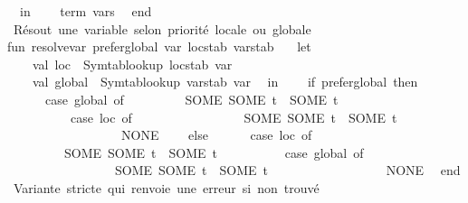 \begin{isabellebody}
\ \ in\isanewline
\ \ \ \ {\isacharparenleft}{\kern0pt}term{\isacharcomma}{\kern0pt}\ vars{\isacharparenright}{\kern0pt}\isanewline
\ \ end\isanewline
\isanewline
{\isacharparenleft}{\kern0pt}{\isacharasterisk}{\kern0pt}\ Résout\ une\ variable\ selon\ priorité\ locale\ ou\ globale\ {\isacharasterisk}{\kern0pt}{\isacharparenright}{\kern0pt}\isanewline
fun\ resolve{\isacharunderscore}{\kern0pt}var\ prefer{\isacharunderscore}{\kern0pt}global\ var\ locstab\ varstab\ {\isacharequal}{\kern0pt}\isanewline
\ \ let\isanewline
\ \ \ \ val\ loc\ {\isacharequal}{\kern0pt}\ Symtab{\isachardot}{\kern0pt}lookup\ locstab\ var\isanewline
\ \ \ \ val\ global\ {\isacharequal}{\kern0pt}\ Symtab{\isachardot}{\kern0pt}lookup\ varstab\ var\isanewline
\ \ in\isanewline
\ \ \ \ if\ prefer{\isacharunderscore}{\kern0pt}global\ then\isanewline
\ \ \ \ \ \ {\isacharparenleft}{\kern0pt}case\ global\ of\isanewline
\ \ \ \ \ \ \ \ \ SOME\ {\isacharparenleft}{\kern0pt}SOME\ t{\isacharparenright}{\kern0pt}\ {\isacharequal}{\kern0pt}{\isachargreater}{\kern0pt}\ SOME\ t\isanewline
\ \ \ \ \ \ \ {\isacharbar}{\kern0pt}\ {\isacharunderscore}{\kern0pt}\ {\isacharequal}{\kern0pt}{\isachargreater}{\kern0pt}\ {\isacharparenleft}{\kern0pt}case\ loc\ of\isanewline
\ \ \ \ \ \ \ \ \ \ \ \ \ \ \ \ \ SOME\ {\isacharparenleft}{\kern0pt}SOME\ t{\isacharparenright}{\kern0pt}\ {\isacharequal}{\kern0pt}{\isachargreater}{\kern0pt}\ SOME\ t\isanewline
\ \ \ \ \ \ \ \ \ \ \ \ \ \ \ {\isacharbar}{\kern0pt}\ {\isacharunderscore}{\kern0pt}\ {\isacharequal}{\kern0pt}{\isachargreater}{\kern0pt}\ NONE{\isacharparenright}{\kern0pt}{\isacharparenright}{\kern0pt}\isanewline
\ \ \ \ else\isanewline
\ \ \ \ \ \ {\isacharparenleft}{\kern0pt}case\ loc\ of\isanewline
\ \ \ \ \ \ \ \ \ SOME\ {\isacharparenleft}{\kern0pt}SOME\ t{\isacharparenright}{\kern0pt}\ {\isacharequal}{\kern0pt}{\isachargreater}{\kern0pt}\ SOME\ t\isanewline
\ \ \ \ \ \ \ {\isacharbar}{\kern0pt}\ {\isacharunderscore}{\kern0pt}\ {\isacharequal}{\kern0pt}{\isachargreater}{\kern0pt}\ {\isacharparenleft}{\kern0pt}case\ global\ of\isanewline
\ \ \ \ \ \ \ \ \ \ \ \ \ \ \ \ \ SOME\ {\isacharparenleft}{\kern0pt}SOME\ t{\isacharparenright}{\kern0pt}\ {\isacharequal}{\kern0pt}{\isachargreater}{\kern0pt}\ SOME\ t\isanewline
\ \ \ \ \ \ \ \ \ \ \ \ \ \ \ {\isacharbar}{\kern0pt}\ {\isacharunderscore}{\kern0pt}\ {\isacharequal}{\kern0pt}{\isachargreater}{\kern0pt}\ NONE{\isacharparenright}{\kern0pt}{\isacharparenright}{\kern0pt}\isanewline
\ \ end\isanewline
\isanewline
{\isacharparenleft}{\kern0pt}{\isacharasterisk}{\kern0pt}\ Variante\ stricte\ qui\ renvoie\ une\ erreur\ si\ non\ trouvé\ {\isacharasterisk}{\kern0pt}{\isacharparenright}{\kern0pt}\isanewline

\end{isabellebody}
